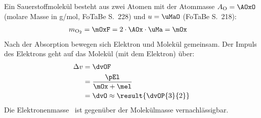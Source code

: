 Ein Sauerstoffmolekül besteht aus zwei Atomen mit der Atommasse $A_\text{O} = \AOxO$ (molare Masse in g/mol, FoTaBe S.~228) und $u = \uMaO$ (FoTaBe S.~218):
\begin{align}
 m_{\text{O}_2} &= \mOxF = 2\cdot\AOx\cdot\uMa = \mOx
\end{align}
Nach der Absorption bewegen sich Elektron und Molekül gemeinsam. Der Impuls des Elektrons geht auf das Molekül (mit dem Elektron) über:
\begin{align}
 \Delta v &= \dvOF \\
   &= \frac{\pEl}{\mOx+\mel} \\
   &= \dvO \approx \result{\dvOP{3}{2}}
\end{align}
Die Elektronenmasse \mel\ ist gegenüber der Molekülmasse vernachlässigbar.
